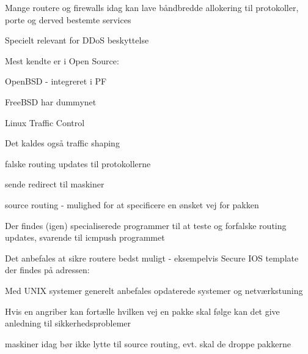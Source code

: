 \documentclass[Screen16to9,17pt]{foils}
\begin{document}
\begin{list1}
\item Mange routere og firewalls idag kan lave båndbredde allokering til
  protokoller, porte og derved bestemte services
  \item Specielt relevant for DDoS beskyttelse
\item Mest kendte er i Open Source:
\begin{list2}
\item OpenBSD - integreret i PF
\item FreeBSD har dummynet
\item Linux Traffic Control
\end{list2}
\item Det kaldes også traffic shaping
\end{list1}



\begin{list1}
  \item falske routing updates til protokollerne
\item sende redirect til maskiner
\item source routing - mulighed for at specificere en ønsket vej for
  pakken
\item Der findes (igen) specialiserede programmer til at teste og
  forfalske routing updates, svarende til icmpush programmet
\item Det anbefales at sikre routere bedst muligt - eksempelvis
Secure IOS template der findes på adressen:\\
{\small {}}
\item Med UNIX systemer generelt anbefales opdaterede systemer og netværkstuning
\end{list1}



\begin{list1}
\item Hvis en angriber kan fortælle hvilken vej en pakke skal følge
  kan det give anledning til sikkerhedsproblemer
\item maskiner idag bør ikke lytte til source routing, evt. skal de
  droppe pakkerne
\end{list1}


\slidenext
\end{document}
